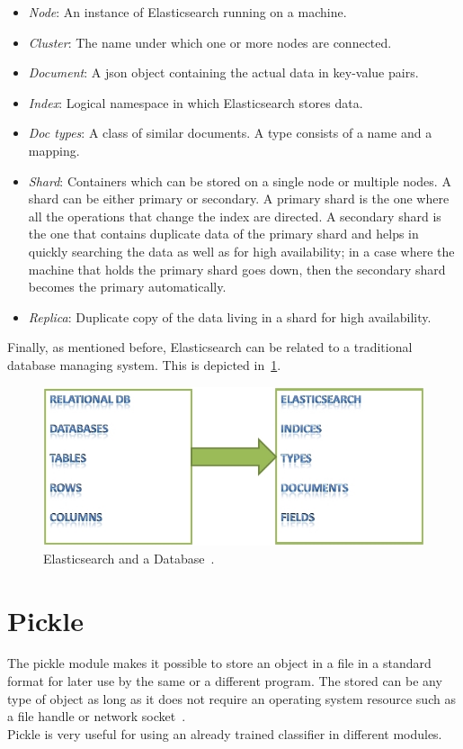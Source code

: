 \begin{itemize}
	\item \textit{Node}: An instance of Elasticsearch running on a machine.
	\item \textit{Cluster}: The name under which one or more nodes are connected.
	\item \textit{Document}: A \ac{json} object containing the actual data in key-value pairs.
	\item \textit{Index}: Logical namespace in which Elasticsearch stores data.
	\item \textit{Doc types}: A class of similar documents. A type consists of a name and a mapping.
	\item \textit{Shard}: Containers which can be stored on a single node or multiple nodes. A  shard can be either primary or secondary. A primary shard is the one where all the operations that change the index are directed. A secondary shard is the one that contains duplicate data of the primary shard and helps in quickly searching the data as well as for high availability; in a case where the machine that holds the primary shard goes down, then the secondary shard becomes the primary automatically.
	\item \textit{Replica}: Duplicate copy of the data living in a shard for high availability.
\end{itemize}
Finally, as mentioned before, Elasticsearch can be related to a traditional database managing system. This is depicted in~\cref{fig:elastic2}.
\begin{figure}
	\includegraphics[width=\linewidth]{img/elastic_1.png}
	\caption{Elasticsearch and a Database~\cite{elastic1}.}
	\label{fig:elastic2}
\end{figure}
\section{Pickle}
The pickle module makes it possible to store an object in a file in a standard format for later use by the same or a different program. The stored can be any type of object as long as it does not require an operating system resource such as a file handle or network socket~\cite{pickle}.\\
Pickle is very useful for using an already trained classifier in different modules.





